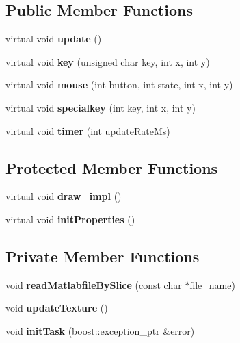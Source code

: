 \subsection*{Public Member Functions}
\begin{DoxyCompactItemize}
\item 
virtual void {\bfseries update} ()\label{classSoundfieldViewer_1_1MatlabFieldViewer_ad4179f0b169c56aeb5ed2fdb227476e0}

\item 
virtual void {\bfseries key} (unsigned char key, int x, int y)\label{classSoundfieldViewer_1_1MatlabFieldViewer_a18aca29b1299f771d4d19ce758076854}

\item 
virtual void {\bfseries mouse} (int button, int state, int x, int y)\label{classSoundfieldViewer_1_1MatlabFieldViewer_aefb79554ba4d7a3948f4bdd3ab721a10}

\item 
virtual void {\bfseries specialkey} (int key, int x, int y)\label{classSoundfieldViewer_1_1MatlabFieldViewer_a22ee017fec802efaa6b89c9711c810da}

\item 
virtual void {\bfseries timer} (int update\-Rate\-Ms)\label{classSoundfieldViewer_1_1MatlabFieldViewer_ac579345567afcdb19102f422d0217c99}

\end{DoxyCompactItemize}
\subsection*{Protected Member Functions}
\begin{DoxyCompactItemize}
\item 
virtual void {\bfseries draw\-\_\-impl} ()\label{classSoundfieldViewer_1_1MatlabFieldViewer_a87acba72622f2146e40344104d2cd1c4}

\item 
virtual void {\bfseries init\-Properties} ()\label{classSoundfieldViewer_1_1MatlabFieldViewer_a371dae830a193679632ddda4746b8f01}

\end{DoxyCompactItemize}
\subsection*{Private Member Functions}
\begin{DoxyCompactItemize}
\item 
void {\bfseries read\-Matlabfile\-By\-Slice} (const char $\ast$file\-\_\-name)\label{classSoundfieldViewer_1_1MatlabFieldViewer_a5a9196549318b9ae0fe878cca1e1effb}

\item 
void {\bfseries update\-Texture} ()\label{classSoundfieldViewer_1_1MatlabFieldViewer_a51971938c28c95bd563aa9ee4f9fd563}

\item 
void {\bfseries init\-Task} (boost\-::exception\-\_\-ptr \&error)\label{classSoundfieldViewer_1_1MatlabFieldViewer_a88bf6db79cbd3cf8caa7787f143ae4a3}

\end{DoxyCompactItemize}
